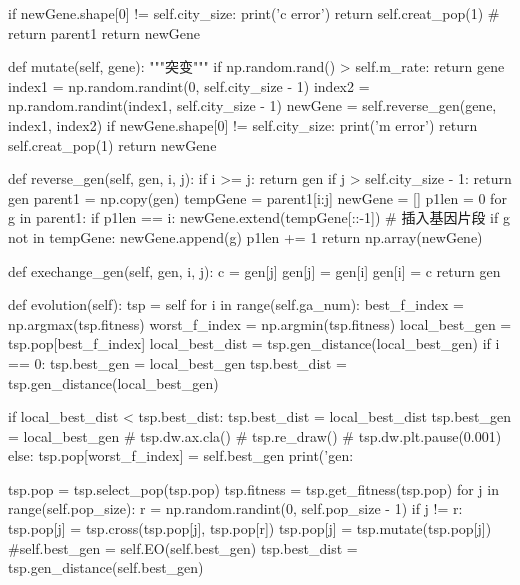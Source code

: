 \documentclass{ctexart}
\begin{document}
\begin{python}
        if newGene.shape[0] != self.city_size:
            print('c error')
            return self.creat_pop(1)
            # return parent1
        return newGene

    def mutate(self, gene):
        """突变"""
        if np.random.rand() > self.m_rate:
            return gene
        index1 = np.random.randint(0, self.city_size - 1)
        index2 = np.random.randint(index1, self.city_size - 1)
        newGene = self.reverse_gen(gene, index1, index2)
        if newGene.shape[0] != self.city_size:
            print('m error')
            return self.creat_pop(1)
        return newGene

    def reverse_gen(self, gen, i, j):
        if i >= j:
            return gen
        if j > self.city_size - 1:
            return gen
        parent1 = np.copy(gen)
        tempGene = parent1[i:j]
        newGene = []
        p1len = 0
        for g in parent1:
            if p1len == i:
                newGene.extend(tempGene[::-1])  # 插入基因片段
            if g not in tempGene:
                newGene.append(g)
            p1len += 1
        return np.array(newGene)

    def exechange_gen(self, gen, i, j):
        c = gen[j]
        gen[j] = gen[i]
        gen[i] = c
        return gen

    def evolution(self):
        tsp = self
        for i in range(self.ga_num):
            best_f_index = np.argmax(tsp.fitness)
            worst_f_index = np.argmin(tsp.fitness)
            local_best_gen = tsp.pop[best_f_index]
            local_best_dist = tsp.gen_distance(local_best_gen)
            if i == 0:
                tsp.best_gen = local_best_gen
                tsp.best_dist = tsp.gen_distance(local_best_gen)

            if local_best_dist < tsp.best_dist:
                tsp.best_dist = local_best_dist
                tsp.best_gen = local_best_gen
                # tsp.dw.ax.cla()
                # tsp.re_draw()
                # tsp.dw.plt.pause(0.001)
            else:
                tsp.pop[worst_f_index] = self.best_gen
            print('gen:%

            tsp.pop = tsp.select_pop(tsp.pop)
            tsp.fitness = tsp.get_fitness(tsp.pop)
            for j in range(self.pop_size):
                r = np.random.randint(0, self.pop_size - 1)
                if j != r:
                    tsp.pop[j] = tsp.cross(tsp.pop[j], tsp.pop[r])
                    tsp.pop[j] = tsp.mutate(tsp.pop[j])
            #self.best_gen = self.EO(self.best_gen)
            tsp.best_dist = tsp.gen_distance(self.best_gen)


\end{python}
\end{document}
